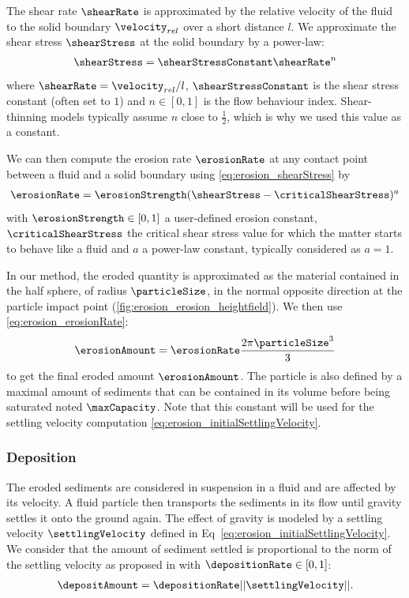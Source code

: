 The shear rate $\shearRate$ is approximated by the relative velocity of the fluid to the solid boundary $\velocity_{rel}$ over a short distance $l$.
We approximate the shear stress $\shearStress$ at the solid boundary by a power-law:
\begin{align}\label{eq:erosion_shearStress}
\shearStress = \shearStressConstant \shearRate^n
\end{align}
where $\shearRate = \velocity_{rel}/l$, $\shearStressConstant$ is the shear stress constant (often set to $1$) and $n \in [0,1]$ is the flow behaviour index. Shear-thinning models typically assume $n$ close to $\frac{1}{2}$, which is why we used this value as a constant.  

We can then compute the erosion rate $\erosionRate$ at any contact point between a fluid and a solid boundary using \eqref{eq:erosion_shearStress} by 
\begin{align}\label{eq:erosion_erosionRate}
\erosionRate = \erosionStrength (\shearStress - \criticalShearStress)^a
\end{align}
with $\erosionStrength \in [0,1]$ a user-defined erosion constant, $\criticalShearStress$ the critical shear stress value for which the matter starts to behave like a fluid and $a$ a power-law constant, typically considered as $a = 1$. 

In our method, the eroded quantity is approximated as the material contained in the half sphere, of radius $\particleSize$, in the normal opposite direction at the particle impact point (\cref{fig:erosion_erosion_heightfield}). We then use \eqref{eq:erosion_erosionRate}: 
\begin{align}\label{eq:erosion_erosionAmount} 
\erosionAmount = \erosionRate \frac{ 2 \pi \particleSize^3 }{ 3 }
\end{align}
to get the final eroded amount $\erosionAmount$. The particle is also defined by a maximal amount of sediments that can be contained in its volume before being saturated noted $\maxCapacity$. Note that this constant will be used for the settling velocity computation \eqref{eq:erosion_initialSettlingVelocity}.

\subsubsection{Deposition}
The eroded sediments are considered in suspension in a fluid and are affected by its velocity. A fluid particle then transports the sediments in its flow until gravity settles it onto the ground again. The effect of gravity is modeled by a settling velocity $\settlingVelocity$ defined in Eq~\eqref{eq:erosion_initialSettlingVelocity}. We consider that the amount of sediment settled is proportional to the norm of the settling velocity as proposed in \cite{Wojtan2007} with $\depositionRate \in [0,1]$: 
\begin{align}\label{eq:erosion_deltaDepositon}
\depositAmount = \depositionRate ||\settlingVelocity||.
\end{align}



